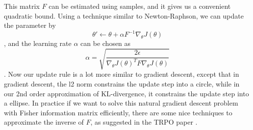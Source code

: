 This matrix $F$ can be estimated using samples, and it gives us a convenient quadratic bound. Using a technique similar to Newton-Raphson, we can update the parameter by 
\[\theta' \leftarrow \theta  + \alpha F^{-1}\nabla_\theta J(\theta)\]
, and the learning rate $\alpha$ can be chosen as 
\[
\alpha = \sqrt{\frac{2\epsilon}{\nabla_\theta J(\theta)^TF\nabla_\theta J(\theta)}}
\]. Now our update rule is a lot more similar to gradient descent, except that in gradient descent, the l2 norm constrains the update step into a circle, while in our 2nd order approximation of KL-divergence, it constrains the update step into a ellipse. In practice if we want to solve this natural gradient descent problem with Fisher information matrix efficiently, there are some nice techniques to approximate the inverse of $F$, as suggested in the TRPO paper \cite{schulman2015trust}.

